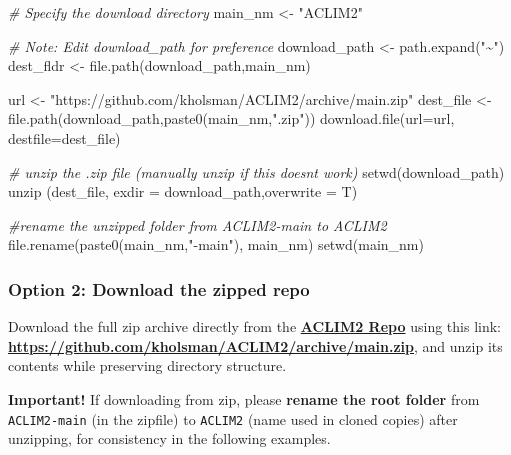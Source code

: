 \documentclass[
]{article}
\newenvironment{Shaded}{\begin{snugshade}}{\end{snugshade}}
\newcommand{\AttributeTok}[1]{\textcolor[rgb]{0.77,0.63,0.00}{#1}}
\newcommand{\CommentTok}[1]{\textcolor[rgb]{0.56,0.35,0.01}{\textit{#1}}}
\newcommand{\FunctionTok}[1]{\textcolor[rgb]{0.00,0.00,0.00}{#1}}
\newcommand{\NormalTok}[1]{#1}
\newcommand{\OtherTok}[1]{\textcolor[rgb]{0.56,0.35,0.01}{#1}}
\newcommand{\StringTok}[1]{\textcolor[rgb]{0.31,0.60,0.02}{#1}}
\begin{document}
\begin{Shaded}
\begin{Highlighting}[]
    \CommentTok{\# Specify the download directory}
\NormalTok{    main\_nm       }\OtherTok{\textless{}{-}} \StringTok{"ACLIM2"}

    \CommentTok{\# Note: Edit download\_path for preference}
\NormalTok{    download\_path }\OtherTok{\textless{}{-}}  \FunctionTok{path.expand}\NormalTok{(}\StringTok{"\textasciitilde{}"}\NormalTok{)}
\NormalTok{    dest\_fldr     }\OtherTok{\textless{}{-}} \FunctionTok{file.path}\NormalTok{(download\_path,main\_nm)}
    
\NormalTok{    url           }\OtherTok{\textless{}{-}} \StringTok{"https://github.com/kholsman/ACLIM2/archive/main.zip"}
\NormalTok{    dest\_file     }\OtherTok{\textless{}{-}} \FunctionTok{file.path}\NormalTok{(download\_path,}\FunctionTok{paste0}\NormalTok{(main\_nm,}\StringTok{".zip"}\NormalTok{))}
    \FunctionTok{download.file}\NormalTok{(}\AttributeTok{url=}\NormalTok{url, }\AttributeTok{destfile=}\NormalTok{dest\_file)}
    
    \CommentTok{\# unzip the .zip file (manually unzip if this doesn\textquotesingle{}t work)}
    \FunctionTok{setwd}\NormalTok{(download\_path)}
    \FunctionTok{unzip}\NormalTok{ (dest\_file, }\AttributeTok{exdir =}\NormalTok{ download\_path,}\AttributeTok{overwrite =}\NormalTok{ T)}
    
    \CommentTok{\#rename the unzipped folder from ACLIM2{-}main to ACLIM2}
    \FunctionTok{file.rename}\NormalTok{(}\FunctionTok{paste0}\NormalTok{(main\_nm,}\StringTok{"{-}main"}\NormalTok{), main\_nm)}
    \FunctionTok{setwd}\NormalTok{(main\_nm)}
\end{Highlighting}
\end{Shaded}

\hypertarget{option-2-download-the-zipped-repo}{%
\subsubsection{Option 2: Download the zipped
repo}\label{option-2-download-the-zipped-repo}}

Download the full zip archive directly from the
\href{https://github.com/kholsman/ACLIM2}{\textbf{ACLIM2 Repo}} using
this link:
\href{https://github.com/kholsman/ACLIM2/archive/main.zip}{\textbf{https://github.com/kholsman/ACLIM2/archive/main.zip}},
and unzip its contents while preserving directory structure.

\textbf{Important!} If downloading from zip, please \textbf{rename the
root folder} from \texttt{ACLIM2-main} (in the zipfile) to
\texttt{ACLIM2} (name used in cloned copies) after unzipping, for
consistency in the following examples.
\end{document}
